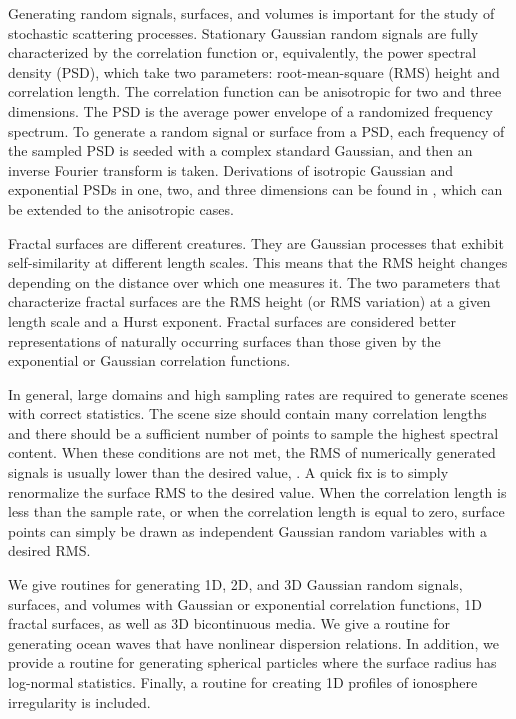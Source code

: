 


Generating random signals, surfaces, and volumes is important for the study of stochastic scattering processes.  Stationary Gaussian random signals are fully characterized by the correlation function or, equivalently, the power spectral density (PSD), which take two parameters: root-mean-square (RMS) height and correlation length.  The correlation function can be anisotropic for two and three dimensions. The PSD is the average power envelope of a randomized frequency spectrum. To generate a random signal or surface from a PSD, each frequency of the sampled PSD is seeded with a complex standard Gaussian, and then an inverse Fourier transform is taken. Derivations of isotropic  Gaussian and exponential PSDs in one, two, and three dimensions can be found in \cite{mack2011analytic}, which can be extended to the anisotropic cases. 

Fractal surfaces are different creatures. They are Gaussian processes that exhibit self-similarity at different length scales. This means that the RMS height changes depending on the distance over which one measures it. The two parameters that characterize fractal surfaces are the RMS height (or RMS variation) at a given length scale and a Hurst exponent. Fractal surfaces are considered better representations of naturally occurring surfaces than those given by the exponential or Gaussian correlation functions.

In general, large domains and high sampling rates are required to generate scenes with correct statistics. The scene size should contain many correlation lengths and there should be a sufficient number of points to sample the highest spectral content. When these conditions are not met, the RMS of numerically generated signals is usually lower than the desired value, \cite{mack2013generating}. A quick fix is to simply renormalize the surface RMS to the desired value. When the correlation length is less than the sample rate, or when the correlation length is equal to zero, surface points can simply be drawn as independent Gaussian random variables with a desired RMS. 

We give routines for generating 1D, 2D, and 3D Gaussian random signals, surfaces, and volumes with Gaussian or exponential correlation functions, 1D fractal surfaces, as well as 3D bicontinuous media. We give a routine for generating ocean waves that have nonlinear dispersion relations. In addition, we provide a routine for generating spherical particles where the surface radius has log-normal statistics. Finally, a routine for creating 1D profiles of ionosphere irregularity is included. 


